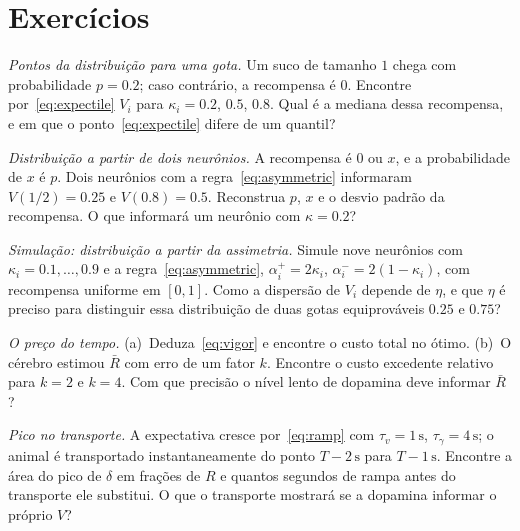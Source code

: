 \section{Exercícios}

\begin{exercise}[\lvlA]
\label{ex:07:1}
\emph{Pontos da distribuição para uma gota.} Um suco de tamanho $1$ chega com probabilidade $p=0.2$; caso contrário, a recompensa é $0$. Encontre por~\eqref{eq:expectile} $V_i$ para $\kappa_i=0.2$, $0.5$, $0.8$. Qual é a mediana dessa recompensa, e em que o ponto~\eqref{eq:expectile} difere de um quantil?
\end{exercise}

\begin{exercise}[\lvlB]
\label{ex:07:2}
\emph{Distribuição a partir de dois neurônios.} A recompensa é $0$ ou $x$, e a probabilidade de $x$ é $p$. Dois neurônios com a regra~\eqref{eq:asymmetric} informaram $V(1/2)=0.25$ e $V(0.8)=0.5$. Reconstrua $p$, $x$ e o desvio padrão da recompensa. O que informará um neurônio com $\kappa=0.2$?
\end{exercise}

\begin{exercise}[\lvlB]
\label{ex:07:3}
\emph{Simulação: distribuição a partir da assimetria.} Simule nove neurônios  com $\kappa_i=0.1,\dots,0.9$ e a regra~\eqref{eq:asymmetric}, $\alpha_i^+=2\kappa_i$, $\alpha_i^-=2(1-\kappa_i)$, com recompensa uniforme em $[0,1]$. Como a dispersão de $V_i$ depende de $\eta$, e que $\eta$ é preciso para distinguir essa distribuição de duas gotas equiprováveis $0.25$ e $0.75$?
\end{exercise}

\begin{exercise}[\lvlA]
\label{ex:07:4}
\emph{O preço do tempo.} (a)~Deduza~\eqref{eq:vigor} e encontre o custo total no ótimo. (b)~O cérebro estimou $\bar R$ com erro de um fator $k$. Encontre o custo excedente relativo para $k=2$ e $k=4$. Com que precisão o nível lento de dopamina deve informar $\bar R$?
\end{exercise}

\begin{exercise}[\lvlB]
\label{ex:07:5}
\emph{Pico no transporte.} A expectativa cresce por~\eqref{eq:ramp} com $\tau_v=1\,\text{s}$, $\tau_\gamma=4\,\text{s}$; o animal é transportado instantaneamente do ponto $T-2\,\text{s}$ para $T-1\,\text{s}$. Encontre a área do pico de $\delta$ em frações de $R$ e quantos segundos de rampa antes do transporte ele substitui. O que o transporte mostrará se a dopamina informar o próprio $V$?
\end{exercise}

